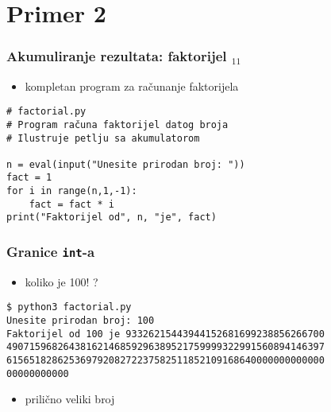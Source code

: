 \documentclass[utf8,compress,aspectratio=169]{beamer}
\begin{document}

\section{Primer 2}


\begin{frame}[fragile]
  \frametitle{Akumuliranje rezultata: faktorijel $_{11}$}
  \begin{itemize}
    \item kompletan program za računanje faktorijela
  \end{itemize}
\begin{verbatim}
# factorial.py
# Program računa faktorijel datog broja
# Ilustruje petlju sa akumulatorom

n = eval(input("Unesite prirodan broj: "))
fact = 1
for i in range(n,1,-1):
    fact = fact * i
print("Faktorijel od", n, "je", fact)
\end{verbatim}
\end{frame}

\begin{frame}[fragile]
  \frametitle{Granice \texttt{int}-a}
  \begin{itemize}
    \item koliko je 100! ?
  \end{itemize}
\begin{verbatim}
$ python3 factorial.py
Unesite prirodan broj: 100
Faktorijel od 100 je 93326215443944152681699238856266700
49071596826438162146859296389521759999322991560894146397
61565182862536979208272237582511852109168640000000000000
00000000000
\end{verbatim}
  \begin{itemize}
    \item prilično veliki broj
  \end{itemize}
\end{frame}
\end{document}
